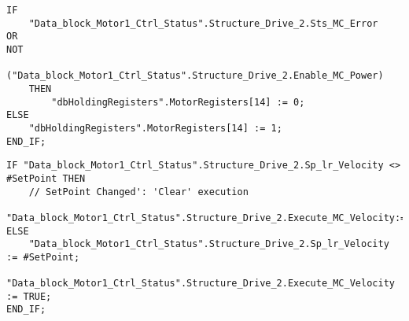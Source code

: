 
\begin{lstlisting}[language=ST,caption={Setting Motor Status},label={lst:MotorStatus}]
IF 
    "Data_block_Motor1_Ctrl_Status".Structure_Drive_2.Sts_MC_Error 
OR 
NOT  
    ("Data_block_Motor1_Ctrl_Status".Structure_Drive_2.Enable_MC_Power) 
    THEN
        "dbHoldingRegisters".MotorRegisters[14] := 0;
ELSE
    "dbHoldingRegisters".MotorRegisters[14] := 1;
END_IF;

\end{lstlisting}
\begin{lstlisting}[language=ST,caption={Attempt at changing velocity when using the MC\_Move\_Velocity. In the end it was more efficient to use MC\_Move\_Jog instead},label={lst:Vel}]
IF "Data_block_Motor1_Ctrl_Status".Structure_Drive_2.Sp_lr_Velocity <> #SetPoint THEN
    // SetPoint Changed': 'Clear' execution
    "Data_block_Motor1_Ctrl_Status".Structure_Drive_2.Execute_MC_Velocity:=FALSE;
ELSE
    "Data_block_Motor1_Ctrl_Status".Structure_Drive_2.Sp_lr_Velocity := #SetPoint;
    "Data_block_Motor1_Ctrl_Status".Structure_Drive_2.Execute_MC_Velocity := TRUE;
END_IF;
\end{lstlisting}


